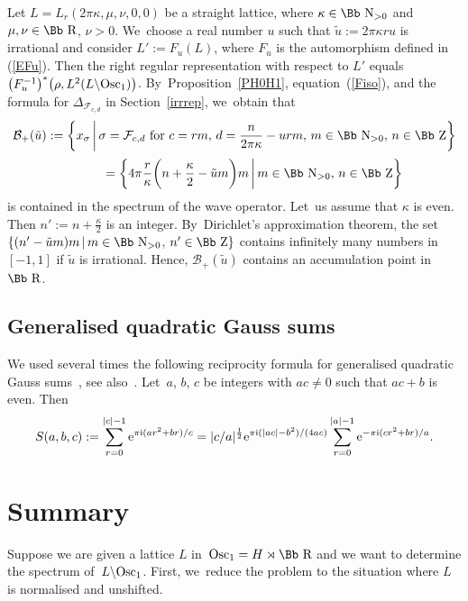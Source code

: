 \documentclass[10pt,a4paper]{amsart}
\newcommand\RR{{\mbox{\Bb R}}}
\newcommand\NN{{\mbox{\Bb N}}}
\newcommand\ZZ{{\mbox{\Bb Z}}}
\newcommand\cF{{\mathcal F}}
\newcommand\cB{{\mathcal B}}
\newcommand{\Osc}{{\rm Osc}}
\numberwithin{equation}{section}
\begin{document}
\begin{Example}
 Let $L=L_r(2\pi\kappa,\mu,\nu,0,0)$ be a straight lattice, where $\kappa\in\NN_{>0}$ and $\mu,\nu\in\RR$, $\nu>0$. We~choose a real number $u$ such that $\tilde u:=2\pi \kappa r u$ is irrational and consider $L':=F_u(L)$, where $F_u$ is the automorphism defined in (\ref{EFu}). Then the right regular representation with respect to $L'$ equals $\big(F_u^{-1}\big)^*\big(\rho, L^2(L\backslash\Osc_1)\big)$. By~Proposition~\ref{PH0H1}, equation~(\ref{Fiso}), and the formula for $\Delta_{\cF_{c,d}}$ in Section~\ref{irrrep}, we~obtain that
\begin{gather*}
\cB_+(\tilde u):=\bigg\{ x_\sigma\,\bigg|\, \sigma=\cF_{c,d} \mbox{ for } c=rm,\, d=\frac n{2\pi\kappa}-urm,\, m\in\NN_{>0},\, n\in\ZZ\bigg\}
\\[.5ex] \hphantom{\cB_+(\tilde u)\,}
{}=\bigg\{ 4\pi\frac r\kappa\bigg (n+\frac \kappa 2-\tilde u m\bigg)m\,\bigg|\, m\in\NN_{>0},\, n\in\ZZ\bigg\}
\end{gather*}
is contained in the spectrum of the wave operator. Let~us assume that $\kappa$ is even. Then $n':=n+\frac \kappa 2$ is an integer. By~Dirichlet's approximation theorem, the set
$\{(n'-\tilde u m)m\,|\,m\in\NN_{>0}$, $n'\in\ZZ\}$ contains infinitely many numbers in~$[-1,1]$ if $\tilde u$ is irrational. Hence, $\cB_+(\tilde u)$ contains an accumulation point in~$\RR$.
\end{Example}

\subsection{Generalised quadratic Gauss sums}
We used several times the following reciprocity formula for generalised quadratic Gauss sums~\cite{Si60}, see also~\cite{BE}. Let~$a$, $b$, $c$ be integers with $ac\not=0$ such that $ac+b$ is even. Then
\begin{gather}\label{qgs}
S(a,b,c):=\sum_{r=0}^{|c|-1} {\rm e}^{\pi {\rm i} (a r^2+br)/c}=|c/a|^{\frac12}{\rm e}^{\pi {\rm i}(|ac|-b^2)/(4ac)}\sum_{r=0}^{|a|-1} {\rm e}^{-\pi {\rm i}(cr^2+br)/a}.
\end{gather}

\section{Summary}\label{S9}
Suppose we are given a lattice $L$ in~$\Osc_1=H\rtimes \RR$ and we want to determine the spectrum of~$L\backslash \Osc_1$. First, we~reduce the problem to the situation where $L$ is normalised and unshifted.
\end{document}
